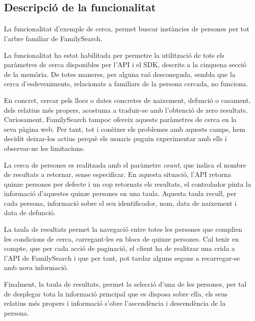 \subsection{Descripció de la funcionalitat}

    \paragraph{}
    La funcionalitat d'exemple de cerca, permet buscar instàncies de persones per tot l'arbre familiar de FamilySearch.

    La funcionalitat ha estat habilitada per permetre la utilització de tots els paràmetres de cerca disponibles per l'API i el SDK, descrits a la cinquena secció de la memòria. De totes maneres, per alguna raó desconeguda, sembla que la cerca d'esdeveniments, relacionats a familiars de la persona cercada, no funciona.

    En concret, cercar pels llocs o dates concretes de naixement, defunció o casament, dels relatius més propers, acostuma a traduir-se amb l'obtenció de zero resultats. Curiosament, FamilySearch tampoc ofereix aquests paràmetres de cerca en la seva pàgina web. Per tant, tot i conèixer els problemes amb aquests camps, hem decidit deixar-los actius perquè els usuaris puguin experimentar amb ells i observar-ne les limitacions.

    La cerca de persones es realitzada amb el paràmetre \emph{count}, que indica el nombre de resultats a retornar, sense especificar. En aquesta situació, l'API retorna quinze persones per defecte i un cop retornats els resultats, el controlador pinta la informació d'aquestes quinze persones en una taula. Aquesta taula recull, per cada persona, informació sobre el seu identificador, nom, data de naixement i data de defunció.

    La taula de resultats permet la navegació entre totes les persones que complien les condicions de cerca, carregant-les en blocs de quinze persones. Cal tenir en compte, que per cada acció de paginació, el client ha de realitzar una crida a l'API de FamilySearch i que per tant, pot tardar alguns segons a recarregar-se amb nova informació.

    Finalment, la taula de resultats, permet la selecció d'una de les persones, per tal de desplegar tota la informació principal que es disposa sobre ella, els seus relatius més propers i informació s'obre l'ascendència i descendència de la persona.
